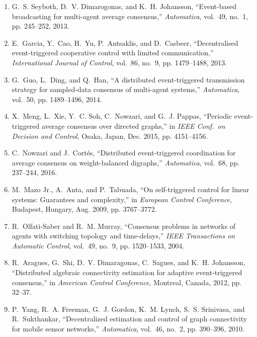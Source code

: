 \documentclass[]{book}
\begin{document}
\begin{enumerate}
\item
G.~S. Seyboth, D.~V. Dimarogonas, and K.~H. Johansson, ``Event-based
  broadcasting for multi-agent average consensus,'' \emph{Automatica}, vol.~49,
  no.~1, pp. 245--252, 2013.

\item
E.~Garcia, Y.~Cao, H.~Yu, P.~Antsaklis, and D.~Casbeer, ``Decentralised
  event-triggered cooperative control with limited communication,''
  \emph{International Journal of Control}, vol.~86, no.~9, pp. 1479--1488,
  2013.

\item
G.~Guo, L.~Ding, and Q.~Han, ``A distributed event-triggered transmission
  strategy for sampled-data consensus of multi-agent systems,''
  \emph{Automatica}, vol.~50, pp. 1489--1496, 2014.

\item
X.~Meng, L.~Xie, Y.~C. Soh, C.~Nowzari, and G.~J. Pappas, ``Periodic
  event-triggered average consensus over directed graphs,'' in \emph{{IEEE}
  Conf.\ on Decision and Control}, Osaka, Japan, Dec. 2015, pp. 4151--4156.

\item
C.~Nowzari and J.~Cort\'es, ``Distributed event-triggered coordination for
  average consensus on weight-balanced digraphs,'' \emph{Automatica}, vol.~68,
  pp. 237--244, 2016.

\item
M.~{Mazo Jr.}, A.~Anta, and P.~Tabuada, ``On self-triggered control for linear
  systems: Guarantees and complexity,'' in \emph{European Control Conference},
  Budapest, Hungary, Aug. 2009, pp. 3767--3772.

\item
R.~Olfati-Saber and R.~M. Murray, ``Consensus problems in networks of agents
  with switching topology and time-delays,'' \emph{IEEE Transactions on
  Automatic Control}, vol.~49, no.~9, pp. 1520--1533, 2004.

\item
R.~Aragues, G.~Shi, D.~V. Dimaragonas, C.~Sagues, and K.~H. Johansson,
  ``Distributed algebraic connectivity estimation for adaptive event-triggered
  consensus,'' in \emph{{A}merican {C}ontrol {C}onference}, Montreal, Canada,
  2012, pp. 32--37.

\item
P.~Yang, R.~A. Freeman, G.~J. Gordon, K.~M. Lynch, S.~S. Srinivasa, and
  R.~Sukthankar, ``Decentralized estimation and control of graph connectivity
  for mobile sensor networks,'' \emph{Automatica}, vol.~46, no.~2, pp.
  390--396, 2010.


\end{enumerate}
\end{document}
